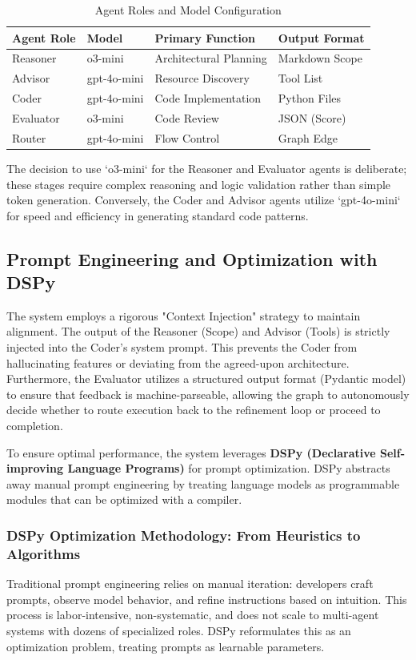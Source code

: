 \documentclass[lettersize,journal]{IEEEtran}
\begin{document}
\begin{table}[H]
\centering
\caption{Agent Roles and Model Configuration}
\label{tab:agent_config}
\begin{tabular}{p{1.5cm} p{1.5cm} p{2.5cm} p{2cm}}
\toprule
\textbf{Agent Role} & \textbf{Model} & \textbf{Primary Function} & \textbf{Output Format} \\
\midrule
Reasoner & o3-mini & Architectural Planning & Markdown Scope \\
Advisor & gpt-4o-mini & Resource Discovery & Tool List \\
Coder & gpt-4o-mini & Code Implementation & Python Files \\
Evaluator & o3-mini & Code Review & JSON (Score) \\
Router & gpt-4o-mini & Flow Control & Graph Edge \\
\bottomrule
\end{tabular}
\end{table}

The decision to use `o3-mini` for the Reasoner and Evaluator agents is deliberate; these stages require complex reasoning and logic validation rather than simple token generation. Conversely, the Coder and Advisor agents utilize `gpt-4o-mini` for speed and efficiency in generating standard code patterns.

\subsection{Prompt Engineering and Optimization with DSPy}
The system employs a rigorous "Context Injection" strategy to maintain alignment. The output of the Reasoner (Scope) and Advisor (Tools) is strictly injected into the Coder's system prompt. This prevents the Coder from hallucinating features or deviating from the agreed-upon architecture. Furthermore, the Evaluator utilizes a structured output format (Pydantic model) to ensure that feedback is machine-parseable, allowing the graph to autonomously decide whether to route execution back to the refinement loop or proceed to completion.

To ensure optimal performance, the system leverages \textbf{DSPy (Declarative Self-improving Language Programs)} for prompt optimization. DSPy abstracts away manual prompt engineering by treating language models as programmable modules that can be optimized with a compiler.

\subsubsection{DSPy Optimization Methodology: From Heuristics to Algorithms}
Traditional prompt engineering relies on manual iteration: developers craft prompts, observe model behavior, and refine instructions based on intuition. This process is labor-intensive, non-systematic, and does not scale to multi-agent systems with dozens of specialized roles. DSPy reformulates this as an optimization problem, treating prompts as learnable parameters.
\end{document}
